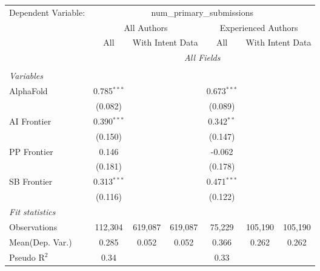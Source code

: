 \begingroup
\centering
\begin{tabular}{lcccccc}
   \tabularnewline \midrule \midrule
   Dependent Variable: & \multicolumn{6}{c}{num\_primary\_submissions}\\
 & \multicolumn{3}{c}{All Authors} & \multicolumn{3}{c}{Experienced Authors} \\
\cmidrule(lr){2-4} \cmidrule(lr){5-7}
 & \multicolumn{1}{c}{All} & \multicolumn{2}{c}{With Intent Data} & \multicolumn{1}{c}{All} & \multicolumn{2}{c}{With Intent Data} \\
\cmidrule(lr){2-2} \cmidrule(lr){3-4} \cmidrule(lr){5-5} \cmidrule(lr){6-7}
 & \multicolumn{6}{c}{\textit{All Fields}} \\ \\
   \emph{Variables}\\
   AlphaFold    & 0.785$^{***}$ &         &         & 0.673$^{***}$ &         &   \\   
                & (0.082)       &         &         & (0.089)       &         &   \\   
   AI Frontier  & 0.390$^{***}$ &         &         & 0.342$^{**}$  &         &   \\   
                & (0.150)       &         &         & (0.147)       &         &   \\   
   PP Frontier  & 0.146         &         &         & -0.062        &         &   \\   
                & (0.181)       &         &         & (0.178)       &         &   \\   
   SB Frontier  & 0.313$^{***}$ &         &         & 0.471$^{***}$ &         &   \\   
                & (0.116)       &         &         & (0.122)       &         &   \\   
   \midrule
   \emph{Fit statistics}\\
   Observations & 112,304       & 619,087 & 619,087 & 75,229        & 105,190 & 105,190\\  
Mean(Dep. Var.) & 0.285 & 0.052 & 0.052 & 0.366 & 0.262 & 0.262 \\
   Pseudo R$^2$ & 0.34          &         &         & 0.33          &         & \\  
   

\end{tabular}
